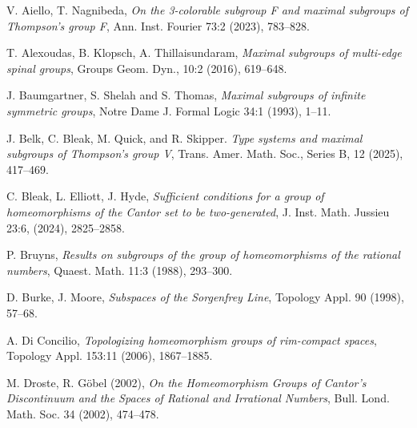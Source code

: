 \documentclass[11pt]{amsart}
\theoremstyle{definition}
\begin{document}
\begin{thebibliography}{}

V. Aiello, T. Nagnibeda, {\em On the 3-colorable subgroup F and maximal subgroups
of Thompson’s group F}, Ann. Inst. Fourier 73:2 (2023), 783--828.

T. Alexoudas, B. Klopsch, A. Thillaisundaram, {\em Maximal subgroups of multi-edge spinal groups}, Groups Geom. Dyn., 10:2 (2016), 619--648.




J. Baumgartner, S. Shelah and S. Thomas,
{\em Maximal subgroups of infinite symmetric groups},
Notre Dame J. Formal Logic 34:1 (1993), 1--11.


J. Belk, C. Bleak, M. Quick, and R. Skipper. {\em Type systems and maximal subgroups of Thompson’s group V},
Trans. Amer. Math. Soc., Series B, 12 (2025), 417--469.

C. Bleak, L. Elliott, J. Hyde, {\em Sufficient conditions for a group of homeomorphisms of the Cantor set to be two-generated}, J. Inst. Math. Jussieu 23:6, (2024), 2825--2858. %

P. Bruyns,
{\em Results on subgroups of the group of homeomorphisms of the rational numbers}, Quaest. Math. 11:3 (1988), 293--300.

D. Burke, J. Moore, {\em Subspaces of the Sorgenfrey Line}, Topology Appl. 90 (1998), 57--68.  

A. Di Concilio, {\em Topologizing homeomorphism groups of rim-compact spaces}, Topology Appl. 153:11  (2006), 1867--1885.


M. Droste, R. Göbel (2002), {\em On the Homeomorphism Groups of Cantor's Discontinuum and the Spaces of Rational and Irrational Numbers}, Bull. Lond. Math. Soc. 34 (2002), 474--478.



\end{thebibliography}
\end{document}
